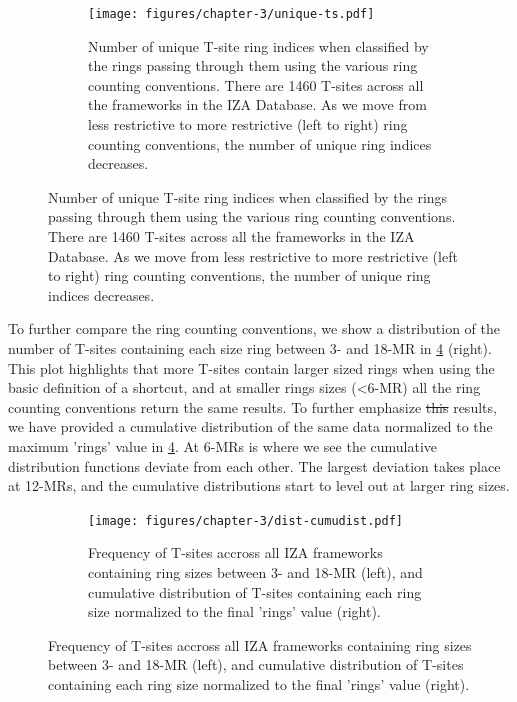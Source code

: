\documentclass[preprint,numrefs,noinfo,sort&compress]{elsarticle}
\providecommand{\DIFadd}[1]{{\protect\color{blue}\uwave{#1}}} %
\providecommand{\DIFdel}[1]{{\protect\color{red}\sout{#1}}}                      %
\providecommand{\DIFaddbegin}{} %
\providecommand{\DIFaddend}{} %
\providecommand{\DIFdelbegin}{} %
\providecommand{\DIFdelend}{} %
\newcommand{\DIFscaledelfig}{0.5}
\newlength{\DIFdelgraphicswidth} %
\newlength{\DIFdelgraphicsheight} %
\newcommand{\DIFaddincludegraphics}[2][]{{\color{blue}\fbox{\DIFOincludegraphics[#1]{#2}}}} %
\newcommand{\DIFdelincludegraphics}[2][]{%
\sbox{\DIFdelgraphicsbox}{\DIFOincludegraphics[#1]{#2}}%
\settoboxwidth{\DIFdelgraphicswidth}{\DIFdelgraphicsbox} %
\settoboxtotalheight{\DIFdelgraphicsheight}{\DIFdelgraphicsbox} %
\scalebox{\DIFscaledelfig}{%
\parbox[b]{\DIFdelgraphicswidth}{\usebox{\DIFdelgraphicsbox}\\[-\baselineskip] \rule{\DIFdelgraphicswidth}{0em}}\llap{\resizebox{\DIFdelgraphicswidth}{\DIFdelgraphicsheight}{%
\setlength{\unitlength}{\DIFdelgraphicswidth}%
\begin{picture}(1,1)%
\thicklines\linethickness{2pt} %
{\color[rgb]{1,0,0}\put(0,0){\framebox(1,1){}}}%
{\color[rgb]{1,0,0}\put(0,0){\line( 1,1){1}}}%
{\color[rgb]{1,0,0}\put(0,1){\line(1,-1){1}}}%
\end{picture}%
}\hspace*{3pt}}} %
} %
\DeclareRobustCommand{\DIFaddbegin}{\DIFOaddbegin \let\includegraphics\DIFaddincludegraphics} %
\DeclareRobustCommand{\DIFaddend}{\DIFOaddend \let\includegraphics\DIFOincludegraphics} %
\DeclareRobustCommand{\DIFdelbegin}{\DIFOdelbegin \let\includegraphics\DIFdelincludegraphics} %
\DeclareRobustCommand{\DIFdelend}{\DIFOaddend \let\includegraphics\DIFOincludegraphics} %
\begin{document}
\begin{figure}
\begin{figure}[H]
\centering
\texttt{[image: figures/chapter-3/unique-ts.pdf]}
\caption{Number of unique T-site ring indices when classified by the rings passing through them using the various ring counting conventions. There are 1460 T-sites across all the frameworks in the IZA Database. As we move from less restrictive to more restrictive (left to right) ring counting conventions, the number of unique ring indices decreases. \label{fig:unique-ts}}
\end{figure}
\end{figure}

To further compare the ring counting conventions, we show a distribution of the number of T-sites containing each size ring between 3- and 18-MR in \cref{fig:tsite-frequency} (right). This plot highlights that more T-sites contain larger sized rings when using the basic definition of a shortcut, and at smaller rings sizes (\textless6-MR) all the ring counting conventions return the same results.  To further emphasize \DIFdelbegin \DIFdel{this }\DIFdelend \DIFaddbegin \DIFadd{these }\DIFaddend results, we have provided a cumulative distribution of the same data normalized to the maximum 'rings' value in \cref{fig:tsite-frequency}. At 6-MRs is where we see the cumulative distribution functions deviate from each other. The largest deviation takes place at 12-MRs, and the cumulative distributions start to level out at larger ring sizes. 

\begin{figure}
\begin{figure}[H]
\centering
\texttt{[image: figures/chapter-3/dist-cumudist.pdf]}
\caption{Frequency of T-sites accross all IZA frameworks containing ring sizes between 3- and 18-MR (left), and cumulative distribution of T-sites containing each ring size normalized to the final 'rings' value (right). \label{fig:tsite-frequency}}
\end{figure}
\end{figure}
\end{document}
